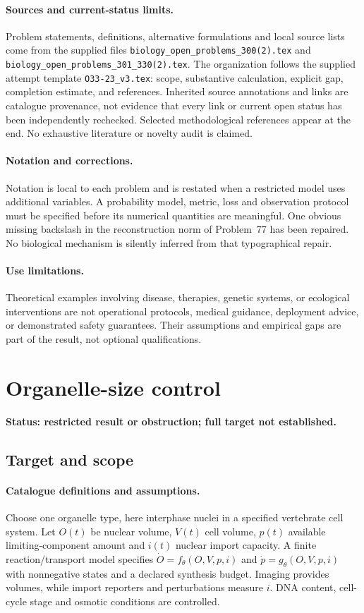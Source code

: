\documentclass[11pt]{article}
\begin{document}
\paragraph{Sources and current-status limits.}
Problem statements, definitions, alternative formulations and local source lists
come from the supplied files
\texttt{biology\_open\_problems\_300(2).tex} and
\texttt{biology\_open\_problems\_301\_330(2).tex}.
The organization follows the supplied attempt template
\texttt{O33-23\_v3.tex}: scope, substantive calculation, explicit gap,
completion estimate, and references. Inherited source annotations and links are
catalogue provenance, not evidence that every link or current open status has
been independently rechecked. Selected methodological references appear at the
end. No exhaustive literature or novelty audit is claimed.

\paragraph{Notation and corrections.}
Notation is local to each problem and is restated when a restricted model uses
additional variables. A probability model, metric, loss and observation protocol
must be specified before its numerical quantities are meaningful. One obvious
missing backslash in the reconstruction norm of Problem~77 has been repaired.
No biological mechanism is silently inferred from that typographical repair.

\paragraph{Use limitations.}
Theoretical examples involving disease, therapies, genetic systems, or ecological
interventions are not operational protocols, medical guidance, deployment advice,
or demonstrated safety guarantees. Their assumptions and empirical gaps are part
of the result, not optional qualifications.


\section*{Organelle-size control}
\label{prob:009}
\noindent\textbf{Status: restricted result or obstruction; full target not established.}
\subsection{Target and scope}
\paragraph{Catalogue definitions and assumptions.}
Choose one organelle type, here interphase nuclei in a specified vertebrate cell system. Let $O(t)$ be nuclear volume, $V(t)$ cell volume, $p(t)$ available limiting-component amount and $i(t)$ nuclear import capacity. A finite reaction/transport model specifies $\dot O=f_\theta(O,V,p,i)$ and $\dot p=g_\theta(O,V,p,i)$ with nonnegative states and a declared synthesis budget. Imaging provides volumes, while import reporters and perturbations measure $i$. DNA content, cell-cycle stage and osmotic conditions are controlled.
\end{document}
